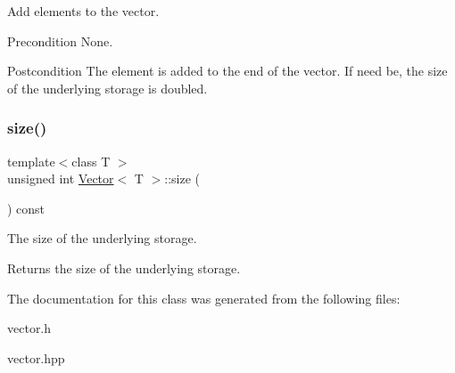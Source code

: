 Add elements to the vector. 

\begin{DoxyPrecond}{Precondition}
None. 
\end{DoxyPrecond}
\begin{DoxyPostcond}{Postcondition}
The element is added to the end of the vector. If need be, the size of the underlying storage is doubled. 
\end{DoxyPostcond}
\mbox{\label{classVector_a5214a382564aedc712b609416aa3b7b1}} 
\subsubsection{\texorpdfstring{size()}{size()}}
{\footnotesize\ttfamily template$<$class T $>$ \\
unsigned int \hyperlink{classVector}{Vector}$<$ T $>$\+::size (\begin{DoxyParamCaption}{ }\end{DoxyParamCaption}) const}



The size of the underlying storage. 

\begin{DoxyReturn}{Returns}
the size of the underlying storage. 
\end{DoxyReturn}


The documentation for this class was generated from the following files\+:\begin{DoxyCompactItemize}
\item 
vector.\+h\item 
vector.\+hpp\end{DoxyCompactItemize}
